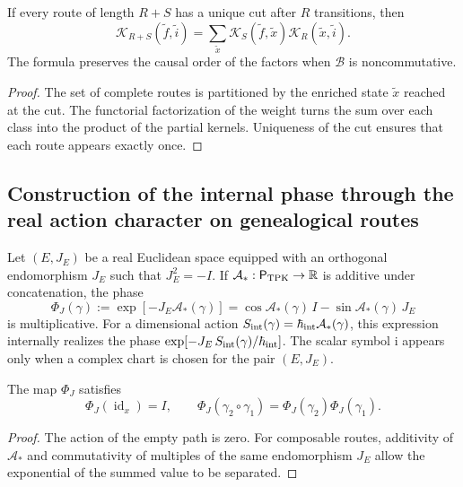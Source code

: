 \begin{proposition}
\label{prop:composicion-kernel-enriquecido-rev2}
If every route of length \(R+S\) has a unique cut after \(R\)
transitions, then
\[
 \mathcal K_{R+S}(\widetilde f,\widetilde i)
 =\sum_{\widetilde x}
 \mathcal K_S(\widetilde f,\widetilde x)
 \mathcal K_R(\widetilde x,\widetilde i).
\]
The formula preserves the causal order of the factors when \(\mathcal B\) is
noncommutative.
\end{proposition}

\begin{proof}
The set of complete routes is partitioned by the enriched state
\(\widetilde x\) reached at the cut. The functorial factorization of the weight
turns the sum over each class into the product of the partial kernels.
Uniqueness of the cut ensures that each route appears exactly once.
\end{proof}

\subsection{Construction of the internal phase through the real action character on genealogical routes}

Let \((E,J_E)\) be a real Euclidean space equipped with an orthogonal
endomorphism \(J_E\) such that \(J_E^2=-I\). If
\(\mathcal A_*:\mathsf P_{\rm TPK}\to\mathbb R\) is additive under
concatenation, the phase
\begin{equation}
 \Phi_J(\gamma)
 :=\exp[-J_E\mathcal A_*(\gamma)]
 =\cos\mathcal A_*(\gamma)\,I
  -\sin\mathcal A_*(\gamma)\,J_E
 \label{eq:fase-interna-caminos-rev2}
\end{equation}
is multiplicative. For a dimensional action
\(S_{\rm int}(\gamma)=\hbar_{\rm int}\mathcal A_*(\gamma)\), this
expression internally realizes the phase
\(\exp[-J_E\,S_{\rm int}(\gamma)/\hbar_{\rm int}]\). The scalar symbol
\(\mathrm i\) appears only when a complex chart is chosen for the pair
\((E,J_E)\).

\begin{proposition}
\label{prop:fase-interna-functor-rev2}
The map \(\Phi_J\) satisfies
\[
 \Phi_J(\operatorname{id}_x)=I,
 \qquad
 \Phi_J(\gamma_2\circ\gamma_1)
 =\Phi_J(\gamma_2)\Phi_J(\gamma_1).
\]
\end{proposition}

\begin{proof}
The action of the empty path is zero. For composable routes, additivity of
\(\mathcal A_*\) and commutativity of multiples of the same endomorphism
\(J_E\) allow the exponential of the summed value to be separated.
\end{proof}

